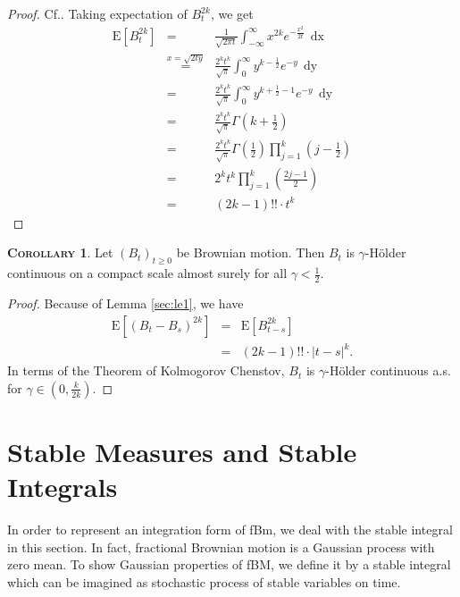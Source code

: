\documentclass[a4paper, twoside, 11pt]{article}
\theoremstyle{definition}
\newtheorem{corollary}[definition]{\scshape Corollary}
\begin{document}
  \begin{proof}
	Cf.\cite{shilling}. Taking expectation of $B_t^{2k}$, we get
	\begin{eqnarray*}
	  \mathrm{E}[B_t^{2k}] &=& \frac{1}{\sqrt{2\pi t}}\int_{-\infty}^{\infty} x^{2k} e^{-\frac{x^2}{2t}}\,\mathop{dx}\\
	  &\overset{x=\sqrt{2ty}}{=}& \frac{2^kt^k}{\sqrt{\pi}} \int_0^{\infty} y^{k-\frac{1}{2}} e^{-y}\,\mathop{dy}\\
	  &=& \frac{2^kt^k}{\sqrt{\pi}} \int_0^{\infty} y^{k+\frac{1}{2}-1} e^{-y}\,\mathop{dy}\\
	  &=& \frac{2^kt^k}{\sqrt{\pi}} \Gamma(k + \frac{1}{2})\\
	  &=& \frac{2^kt^k}{\sqrt{\pi}} \Gamma(\frac{1}{2})\prod_{j=1}^k(j-\frac{1}{2}) \\
	  &=& 2^k t^k\prod_{j=1}^k(\frac{2j-1}{2}) \\
	  &=& (2k - 1)!!\cdot t^k
	\end{eqnarray*}
  \end{proof}

  \begin{corollary}
	Let $(B_t)_{t\ge 0}$ be Brownian motion. Then $B_t$ is $\gamma$-H\"older continuous on a compact scale almost surely for all $\gamma < \frac{1}{2}$.
  \end{corollary}

  \begin{proof}
	Because of Lemma \ref{sec:le1}, we have
	\begin{eqnarray*}
	  \mathrm{E}[(B_t-B_s)^{2k}] &=& \mathrm{E}[B_{t-s}^{2k}]\\
	  &=& (2k - 1)!! \cdot |t-s|^{k}.
	\end{eqnarray*}
	In terms of the Theorem of Kolmogorov Chenstov, $B_t$ is $\gamma$-H\"older continuous a.s. for $\gamma \in (0, \frac{k}{2k})$.
  \end{proof}

  \newpage

  \section{Stable Measures and Stable Integrals}
  \setcounter{equation}{0}
  In order to represent an integration form of fBm, we deal with the stable integral in this section. In fact, fractional Brownian motion is a Gaussian process with zero mean. To show Gaussian properties of fBM, we define it by a 
  stable integral which can be imagined as stochastic process of stable variables on time.
\end{document}
